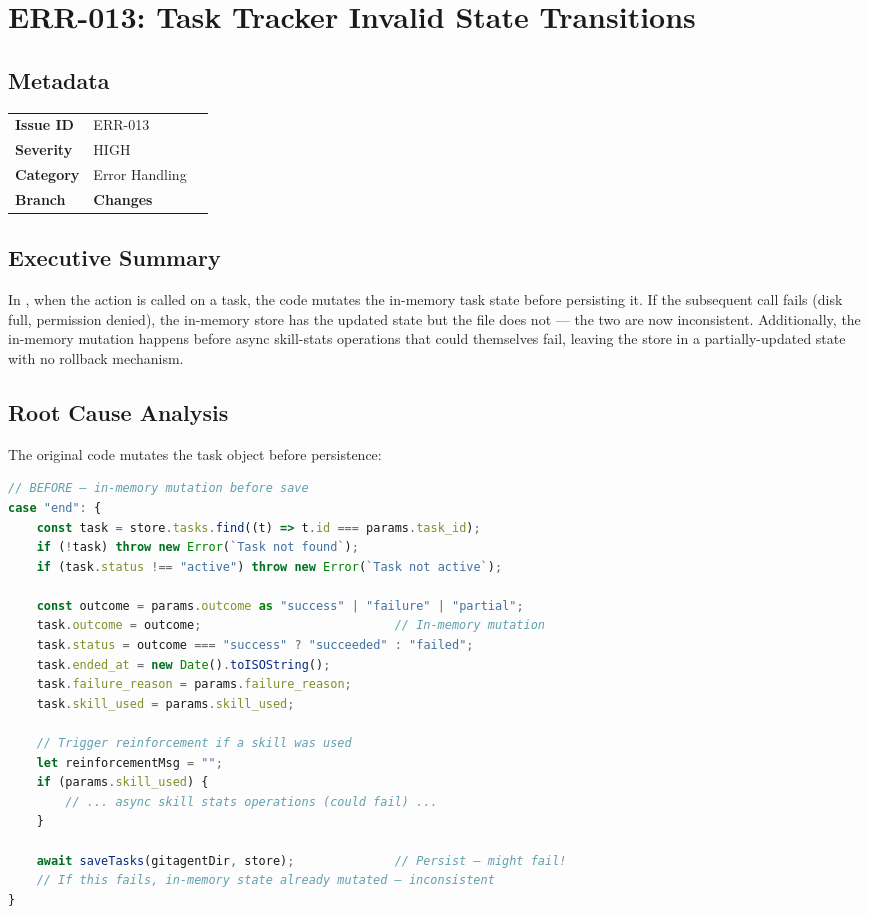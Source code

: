 \section{ERR-013: Task Tracker Invalid State Transitions}
\label{sec:err-013}
\subsection*{Metadata}
\begin{tabular}{ll}
\textbf{Issue ID} & ERR-013 \\
\textbf{Severity} & HIGH \\
\textbf{Category} & Error Handling \\
\textbf{Branch} & 
\textbf{Changes} &  \\
\end{tabular}

\subsection*{Executive Summary}
In , when the  action is called on a task, the code mutates the in-memory task state before persisting it. If the subsequent  call fails (disk full, permission denied), the in-memory store has the updated state but the file does not — the two are now inconsistent. Additionally, the in-memory mutation happens before async skill-stats operations that could themselves fail, leaving the store in a partially-updated state with no rollback mechanism.

\subsection*{Root Cause Analysis}
The original code mutates the task object before persistence:

\begin{lstlisting}[language=TypeScript]
// BEFORE — in-memory mutation before save
case "end": {
    const task = store.tasks.find((t) => t.id === params.task_id);
    if (!task) throw new Error(`Task not found`);
    if (task.status !== "active") throw new Error(`Task not active`);

    const outcome = params.outcome as "success" | "failure" | "partial";
    task.outcome = outcome;                           // In-memory mutation
    task.status = outcome === "success" ? "succeeded" : "failed";
    task.ended_at = new Date().toISOString();
    task.failure_reason = params.failure_reason;
    task.skill_used = params.skill_used;

    // Trigger reinforcement if a skill was used
    let reinforcementMsg = "";
    if (params.skill_used) {
        // ... async skill stats operations (could fail) ...
    }

    await saveTasks(gitagentDir, store);              // Persist — might fail!
    // If this fails, in-memory state already mutated — inconsistent
}
\end{lstlisting}

